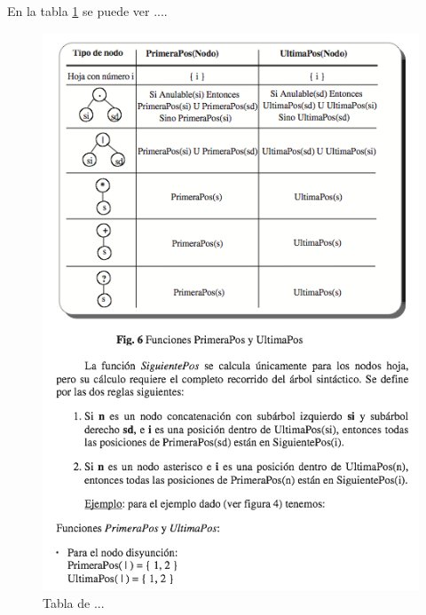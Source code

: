 \documentclass{book}
\begin{document}
En la tabla \ref{fig:tabla2} se puede ver ....
\begin{figure}
\centering
\includegraphics[width=12cm]{img/tabla2.png}
\caption{Tabla de ...}
\label{fig:tabla2}
\end{figure}
\end{document}
